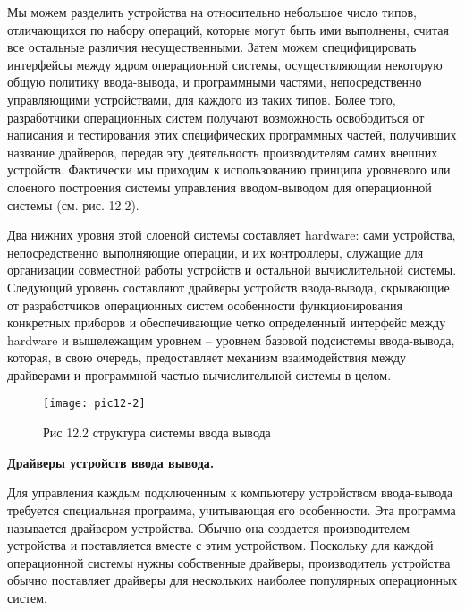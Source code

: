 Мы можем разделить устройства на относительно небольшое число типов, отличающихся по набору операций, которые могут быть ими выполнены, считая все остальные различия несущественными. Затем можем специфицировать интерфейсы между ядром операционной системы, осуществляющим некоторую общую политику ввода-вывода, и программными частями, непосредственно управляющими устройствами, для каждого из таких типов. Более того, разработчики операционных систем получают возможность освободиться от написания и тестирования этих специфических программных частей, получивших название драйверов, передав эту деятельность производителям самих внешних устройств. Фактически мы приходим к использованию принципа уровневого или слоеного построения системы управления вводом-выводом для операционной системы (см. рис. 12.2).

Два нижних уровня этой слоеной системы составляет hardware: сами устройства, непосредственно выполняющие операции, и их контроллеры, служащие для организации совместной работы устройств и остальной вычислительной системы. Следующий уровень составляют драйверы устройств ввода-вывода, скрывающие от разработчиков операционных систем особенности функционирования конкретных приборов и обеспечивающие четко определенный интерфейс между hardware и вышележащим уровнем – уровнем базовой подсистемы ввода-вывода, которая, в свою очередь, предоставляет механизм взаимодействия между драйверами и программной частью вычислительной системы в целом.

\begin{figure}[h]
  \begin{center}
  \texttt{[image: pic12-2]}
  \caption{Рис 12.2 структура системы ввода вывода}
  \end{center}
\end{figure}

\newpage

\begin{center}{\bfseries Драйверы устройств ввода вывода.}
\end{center}

Для управления каждым подключенным к компьютеру устройством ввода-вывода требуется специальная программа, учитывающая его особенности. Эта программа называется драйвером устройства. Обычно она создается производителем устройства и поставляется вместе с этим устройством. Поскольку для каждой операционной системы нужны собственные драйверы, производитель устройства обычно поставляет драйверы для нескольких наиболее популярных операционных систем.

